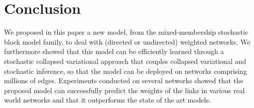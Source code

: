 \section{Conclusion}
\label{sec:concl}

We proposed in this paper a new model, from the mixed-membership stochastic block model family, to deal with (directed or undirected) weighted networks. We furthermore showed that this model can be efficiently learned through a stochastic collapsed variational approach that couples collapsed variational and stochastic inference, so that the model can be deployed on networks comprising millions of edges. Experiments conducted on several networks showed that the proposed model can successfully predict the weights of the links  in various real world networks and that it outperforms the state of the art models. 

